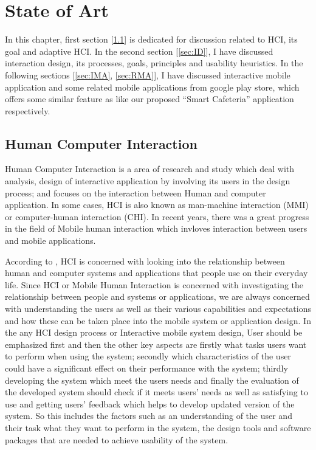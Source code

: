 \chapter{State of Art}
\label{chap:StateofArt}
In this chapter, first section [\ref{sec:HCI}] is dedicated for discussion
related to HCI, its goal and adaptive HCI. In the second section [\ref{sec:ID}],
I have discussed interaction design, its processes, goals, principles and
usability heuristics. In the following sections [\ref{sec:IMA}, \ref{sec:RMA}],
I have discussed interactive mobile application and some related mobile
applications from google play store, which offers some similar feature as like
our proposed ``Smart Cafeteria'' application respectively.

\section{Human Computer Interaction}
\label{sec:HCI}
Human Computer Interaction is a area of research and study which deal with
analysis, design of interactive application by involving its users in
the design process; and focuses on the interaction between Human and computer
application. In some cases, HCI is also known as man-machine interaction (MMI) or
computer-human interaction (CHI). In recent years, there was a great progress in
the field of Mobile human interaction which invloves interaction between users
and mobile applications.

According to \citet{Love:2005:UMH:1076935},  HCI is concerned with looking into
the relationship between human and computer systems and applications that people
use on their everyday life. Since HCI or Mobile Human Interaction is concerned
with investigating the relationship between people and systems or applications,
we are always concerned with understanding the users as well as their various
capabilities and expectations and how these can be taken place into the mobile
system or application design. In the any HCI design process or Interactive
mobile system design, User should be emphasized first and then the other key
aspects are firstly what tasks users want to perform when using the system;
secondly which characteristics of the user could have a significant effect on
their performance with the system; thirdly developing  the system which meet the
users needs and finally the evaluation of the developed system should check if
it meets users' needs as well as satisfying to use and getting users' feedback
which helps to develop updated version of the system. So this includes the
factors such as an understanding of the user and their task what they want to
perform in the system,  the design tools and software packages that are needed
to achieve usability of the system.

